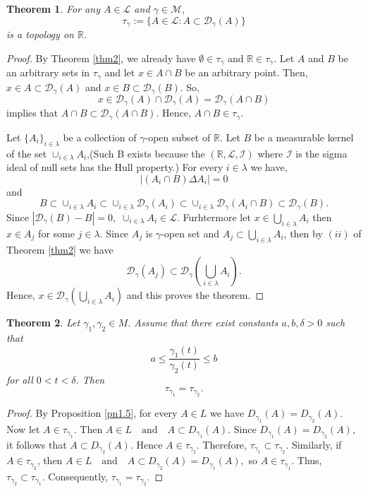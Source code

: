 \documentclass{amsart}
\newtheorem{theorem}{Theorem}
\theoremstyle{plain}
\numberwithin{equation}{section}
\begin{document}
\begin{theorem}
For any $A\in \mathcal{L}$ and $\gamma \in \mathcal{M}$, $$\tau_{\gamma}:= \{A\in \mathcal{L}: A \subset \mathcal{D}_{\gamma}(A)\}$$ is a topology on $\mathbb{R}$.
\end{theorem}
\begin{proof}
By Theorem \ref{thm2}, we already have  $\emptyset \in \tau_{\gamma}$ and $\mathbb{R}\in \tau_{\gamma}$. Let $A$ and $B$ be an arbitrary sets in $\tau_{\gamma}$ and let
    $x\in A\cap B$ be an arbitrary point. Then, $x\in A \subset \mathcal{D}_{\gamma}(A)$ and $x\in B \subset \mathcal{D}_{\gamma}(B)$. So, 
   $$x\in \mathcal{D}_{\gamma}(A) \cap \mathcal{D}_{\gamma}(A)= \mathcal{D}_{\gamma}(A\cap B)$$ implies that $A\cap B \subset \mathcal{D}_{\gamma}(A\cap B).$  Hence, $A\cap B \in \tau_{\gamma}.$

   Let $\{A_{i}\}_{i\in \lambda}$ be a collection of $\gamma$-open subset of $\mathbb{R}$. Let $B$ be a measurable kernel of the set $\cup_{i\in \lambda} A_{i}$,(Such B exists because the $(\mathbb{R}, \mathcal{L}, \mathcal{I})$ where $\mathcal{I}$ is the sigma ideal of null sets has the Hull property.) For every  ${i\in \lambda}$ we have, $$|(A_{i}\cap B)\Delta A_i|=0$$ and $$B\subset \cup_{i\in \lambda} A_{i} \subset \cup_{i\in \lambda} \mathcal{D}_\gamma (A_{i})\subset \cup_{i\in \lambda} \mathcal{D}_\gamma (A_{i} \cap B)\subset \mathcal{D}_\gamma ( B). $$ Since $|\mathcal{D}_\gamma (B)-B|=0,$ $\cup_{i\in \lambda} A_{i} \in \mathcal{L}.$ Furhtermore let $x\in \bigcup_{i\in \lambda} A_i$ then $x\in A_j$ for some $j\in \lambda$. Since $A_j$ is $\gamma$-open set and $A_j \subset \bigcup_{i\in \lambda} A_i$, then by $(ii)$ of Theorem \ref{thm2} we have  $$\mathcal{D}_{\gamma}(A_j)\subset \mathcal{D}_{\gamma}(\bigcup_{i\in \lambda} A_i).$$ Hence, $x\in \mathcal{D}_{\gamma}(\bigcup_{i\in \lambda}A_i)$ and this proves the theorem.
\end{proof}
\begin{theorem}
Let $\gamma_1,\gamma_2\in M$. Assume that there exist constants $a,b,\delta>0$ such that
$$ a\leq \frac{\gamma_1(t)}{\gamma_2(t)}\leq b $$
for all $0<t<\delta$. Then
$$ \tau_{\gamma_1}=\tau_{\gamma_2}. $$
\end{theorem}

\begin{proof}
By Proposition \ref{pn1.5}, for every $A\in L$ we have $ D_{\gamma_1}(A)=D_{\gamma_2}(A). $
Now let $A\in \tau_{\gamma_1}$. Then $ A\in L \quad \text{and} \quad A\subset D_{\gamma_1}(A). $
Since $D_{\gamma_1}(A)=D_{\gamma_2}(A)$, it follows that $ A\subset D_{\gamma_2}(A). $
Hence $A\in \tau_{\gamma_2}$. Therefore, $ \tau_{\gamma_1}\subset \tau_{\gamma_2}. $
Similarly, if $A\in \tau_{\gamma_2}$, then
$ A\in L \quad \text{and} \quad A\subset D_{\gamma_2}(A)=D_{\gamma_1}(A), $
so $A\in \tau_{\gamma_1}$. Thus, $ \tau_{\gamma_2}\subset \tau_{\gamma_1}.$
Consequently, $ \tau_{\gamma_1}=\tau_{\gamma_2}. $
\end{proof}
\end{document}
